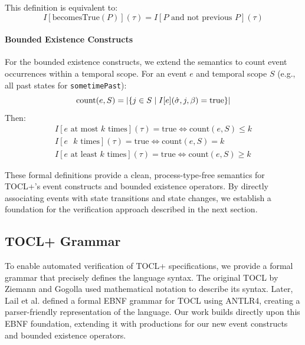 This definition is equivalent to:
\begin{equation}
I[\text{becomesTrue}(P)](\tau) = I[P \text{ and not previous } P](\tau)
\end{equation}

\paragraph{Bounded Existence Constructs}
For the bounded existence constructs, we extend the semantics to count event 
occurrences within a temporal scope. For an event $e$ and temporal scope $S$ 
(e.g., all past states for \texttt{sometimePast}):
\begin{equation}
\text{count}(e, S) = |\{j \in S \mid I[e](\hat{\sigma}, j, \beta) = \text{true}\}|
\vspace{-1em}
\end{equation}
Then:
\begin{equation}
\begin{split}
I[e \text{ at most } k \text{ times}](\tau) = \text{true} \iff \text{count}(e, S) \leq k \\
I[e \text{  } k \text{ times}](\tau) = \text{true} \iff \text{count}(e, S) = k \\
I[e \text{ at least } k \text{ times}](\tau) = \text{true} \iff \text{count}(e, S) \geq k
\end{split}
\end{equation}

These formal definitions provide a clean, process-type-free semantics for TOCL+'s 
event constructs and bounded existence operators. By directly associating events with 
state transitions and state changes, we establish a foundation for the verification 
approach described in the next section.


\subsection{TOCL+ Grammar}

\hspace{1cm} To enable automated verification of TOCL+ specifications, we provide a 
formal grammar that precisely defines the language syntax. The original TOCL by 
Ziemann and Gogolla used mathematical notation to describe its syntax. 
Later, Lail et al. \cite{TOCL2OCL} defined a formal EBNF grammar for TOCL using ANTLR4, 
creating a parser-friendly representation of the language. Our work builds directly 
upon this EBNF foundation, extending it with productions for our new event constructs 
and bounded existence operators.

